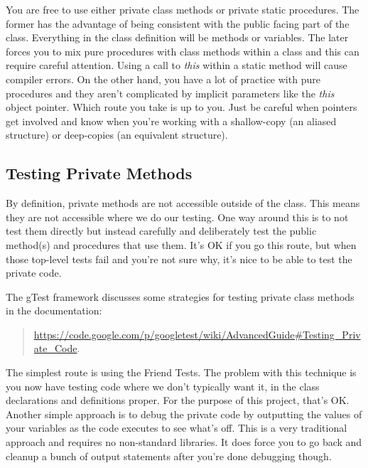\documentclass[10pt]{article}
\begin{document}
You are free to use either private class methods or private static procedures. The former has the advantage of being consistent with the public facing part of the class. Everything in the class definition will be methods or variables. The later forces you to mix pure procedures with class methods within a class and this can require careful attention. Using a call to \textit{this} within a static method will cause compiler errors. On the other hand, you have a lot of practice with pure procedures and they aren't complicated by implicit parameters like the \textit{this} object pointer. Which route you take is up to you. Just be careful when pointers get involved and know when you're working with a shallow-copy (an aliased structure) or deep-copies (an equivalent structure).

\subsection*{Testing Private Methods}

By definition, private methods are not accessible outside of the class. This means they are not accessible where we do our testing. One way around this is to not test them directly but instead carefully and deliberately test the public method(s) and procedures that use them. It's OK if you go this route, but when those top-level tests fail and you're not sure why, it's nice to be able to test the private code. 

The gTest framework discusses some strategies for testing private class methods in the documentation:
\begin{quote}
\url{https://code.google.com/p/googletest/wiki/AdvancedGuide#Testing_Private_Code}. 
\end{quote}
The simplest route is using the Friend Tests.  The problem with this technique is you now have testing code where we don't typically want it, in the class declarations and definitions proper. For the purpose of this project, that's OK. Another simple approach is to debug the private code by outputting the values of your variables as the code executes to see what's off. This is a very traditional approach and requires no non-standard libraries.  It does force you to go back and cleanup a bunch of output statements after you're done debugging though. 
\end{document}
